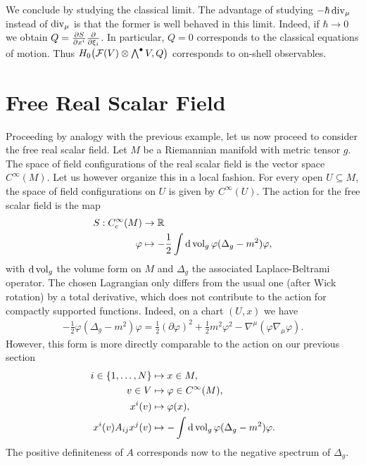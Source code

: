 We conclude by studying the classical limit. The advantage of studying $-\hbar\operatorname{div}_\mu$ instead of $\operatorname{div}_\mu$ is that the former is well behaved in this limit. Indeed, if $\hbar\rightarrow 0$ we obtain $Q=\pdv{S}{x^i}\pdv{\xi_i}$. In particular, $Q=0$ corresponds to the classical equations of motion. Thus $H_0\qty(\mathcal{F}(V)\otimes\bigwedge\nolimits^\bullet V,Q)$ corresponds to on-shell observables.

\section{Free Real Scalar Field}

Proceeding by analogy with the previous example, let us now proceed to consider the free real scalar field. Let $M$ be a Riemannian manifold with metric tensor $g$. The space of field configurations of the real scalar field is the vector space $C^\infty(M)$. Let us however organize this in a local fashion. For every open $U\subseteq M$, the space of field configurations on $U$ is given by $C^\infty(U)$. The action for the free scalar field is the map
\begin{equation}
\begin{aligned}
S:C^\infty_c(M)&\rightarrow\mathbb{R}\\
\varphi&\mapsto -\frac{1}{2}\int\dd{\operatorname{vol}_g}\varphi(\Delta_g-m^2)\varphi,
\end{aligned}
\end{equation}
with $\dd{\operatorname{vol}_g}$ the volume form on $M$ and $\Delta_g$ the associated Laplace-Beltrami operator. The chosen Lagrangian only differs from the usual one (after Wick rotation) by a total derivative, which does not contribute to the action for compactly supported functions. Indeed, on a chart $(U,x)$ we have
\begin{equation}
\begin{aligned}
-\frac{1}{2}\varphi(\Delta_g-m^2)\varphi=\frac{1}{2}(\partial\varphi)^2+\frac{1}{2}m^2\varphi^2-\nabla^\mu(\varphi\nabla_\mu\varphi).
\end{aligned}
\end{equation}
However, this form is more directly comparable to the action on our previous section
\begin{equation}\label{eq:dictionary}
\begin{aligned}
i\in\{1,\dots, N\}&\mapsto x\in M,\\
v\in V&\mapsto \varphi\in C^\infty(M),\\
x^i(v)&\mapsto\varphi(x),\\
x^i(v)A_{ij}x^j(v)&\mapsto -\int\dd{\operatorname{vol}_g}\varphi(\Delta_g-m^2)\varphi.
\end{aligned}
\end{equation}
The positive definiteness of $A$ corresponds now to the negative spectrum of $\Delta_g$.

